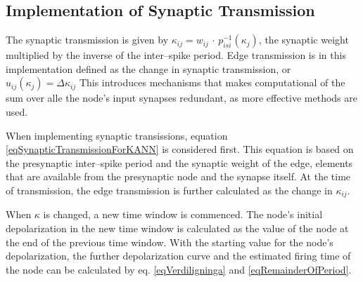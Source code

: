 			\subsection{Implementation of Synaptic Transmission}
			\label{ssecImplementationOfSynPlastKANN}
	
	
			The synaptic transmission is given by $\kappa_{ij} = w_{ij} \, \cdot \, p_{isi}^{-1}(\kappa_j)$, the synaptic weight multiplied by the inverse of the inter--spike period.
			Edge transmission is in this implementation defined as the change in synaptic transmission, or $u_{ij}(\kappa_j) = \Delta \kappa_{ij}$
			This introduces mechanisms that makes computational of the sum over alle the node's input synapses redundant, as more effective methods are used. %
	
			When implementing synaptic transissions, equation \eqref{eqSynapticTransmissionForKANN} is considered first.
			This equation is based on the presynaptic inter--spike period and the synaptic weight of the edge, elements that are available from the presynaptic node and the synapse itself.
			At the time of transmission, the edge transmission is further calculated as the change in $\kappa_{ij}$.
			
			When $\kappa$ is changed, a new time window is commenced. 
			The node's initial depolarization in the new time window is calculated as the value of the node at the end of the previous time window.
			With the starting value for the node's depolarization, the further depolarization curve and the estimated firing time of the node can be calculated by eq. \eqref{eqVerdiligninga} and \eqref{eqRemainderOfPeriod}.

